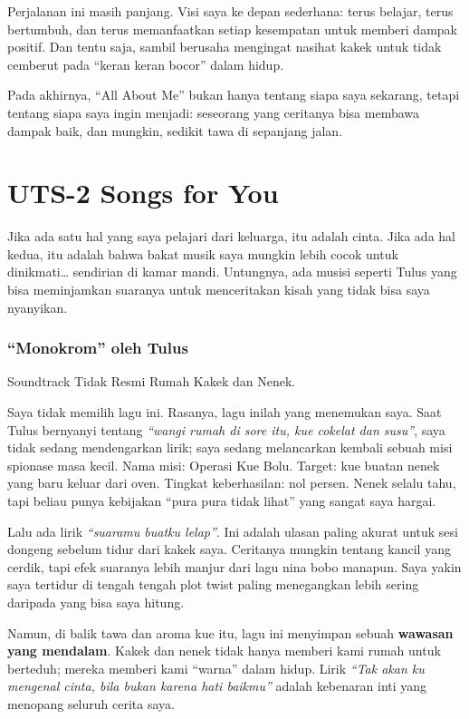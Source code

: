 \documentclass[
  letterpaper,
  DIV=11,
  numbers=noendperiod]{scrreprt}
\begin{document}
Perjalanan ini masih panjang. Visi saya ke depan sederhana: terus
belajar, terus bertumbuh, dan terus memanfaatkan setiap kesempatan untuk
memberi dampak positif. Dan tentu saja, sambil berusaha mengingat
nasihat kakek untuk tidak cemberut pada ``keran keran bocor'' dalam
hidup.

Pada akhirnya, ``All About Me'' bukan hanya tentang siapa saya sekarang,
tetapi tentang siapa saya ingin menjadi: seseorang yang ceritanya bisa
membawa dampak baik, dan mungkin, sedikit tawa di sepanjang jalan.


\chapter{UTS-2 Songs for You}\label{uts-2-songs-for-you}

Jika ada satu hal yang saya pelajari dari keluarga, itu adalah cinta.
Jika ada hal kedua, itu adalah bahwa bakat musik saya mungkin lebih
cocok untuk dinikmati\ldots{} sendirian di kamar mandi. Untungnya, ada
musisi seperti Tulus yang bisa meminjamkan suaranya untuk menceritakan
kisah yang tidak bisa saya nyanyikan.

\subsection{``Monokrom'' oleh Tulus}\label{monokrom-oleh-tulus}

Soundtrack Tidak Resmi Rumah Kakek dan Nenek.

Saya tidak memilih lagu ini. Rasanya, lagu inilah yang menemukan saya.
Saat Tulus bernyanyi tentang \emph{``wangi rumah di sore itu, kue
cokelat dan susu''}, saya tidak sedang mendengarkan lirik; saya sedang
melancarkan kembali sebuah misi spionase masa kecil. Nama misi: Operasi
Kue Bolu. Target: kue buatan nenek yang baru keluar dari oven. Tingkat
keberhasilan: nol persen. Nenek selalu tahu, tapi beliau punya kebijakan
``pura pura tidak lihat'' yang sangat saya hargai.

Lalu ada lirik \emph{``suaramu buatku lelap''}. Ini adalah ulasan paling
akurat untuk sesi dongeng sebelum tidur dari kakek saya. Ceritanya
mungkin tentang kancil yang cerdik, tapi efek suaranya lebih manjur dari
lagu nina bobo manapun. Saya yakin saya tertidur di tengah tengah plot
twist paling menegangkan lebih sering daripada yang bisa saya hitung.

Namun, di balik tawa dan aroma kue itu, lagu ini menyimpan sebuah
\textbf{wawasan yang mendalam}. Kakek dan nenek tidak hanya memberi kami
rumah untuk berteduh; mereka memberi kami ``warna'' dalam hidup. Lirik
\emph{``Tak akan ku mengenal cinta, bila bukan karena hati baikmu''}
adalah kebenaran inti yang menopang seluruh cerita saya.
\end{document}
